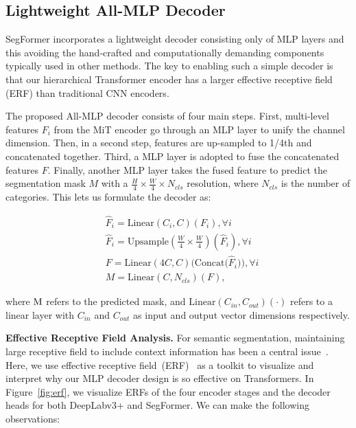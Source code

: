 \subsection{Lightweight All-MLP Decoder} \label{sec:MLP}

SegFormer incorporates a lightweight decoder consisting only of MLP layers and this avoiding the hand-crafted and computationally demanding components typically used in other methods. The key to enabling such a simple decoder is that our hierarchical Transformer encoder has a larger effective receptive field (ERF) than traditional CNN encoders. 

The proposed All-MLP decoder consists of four main steps. First, multi-level features ${F_i}$ from the MiT encoder go through an MLP layer to unify the channel dimension. Then, in a second step, features are up-sampled to 1/4th and concatenated together. Third, a MLP layer is adopted to fuse the concatenated features ${F}$. Finally, another MLP layer takes the fused feature to predict the segmentation mask $M$ with a $\frac{H}{4} \times \frac{W}{4} \times N_{cls}$ resolution, where $N_{cls}$ is the number of categories. This lets us formulate the decoder as:

\begin{equation}
    \begin{aligned}
    &{\hat{F}_i = \text{Linear}(C_i, C)(F_i)}, \forall i\\
    &{{\hat{F}}_i = \text{Upsample}(\frac{W}{4} \times \frac{W}{4})({\hat{F}}_i)}, \forall i\\
    &{{F} = \text{Linear}(4C, C)(\text{Concat}({\hat{F}}_i})), \forall i\\
    &{{M} = \text{Linear}(C, N_{cls})({F})},
    \end{aligned}
    \label{eqn:mlp}
\end{equation}

where ${\rm M}$ refers to the predicted mask, and $\text{Linear}(C_{in}, C_{out})(\cdot)$ refers to a linear layer with $C_{in}$ and $C_{out}$ as input and output vector dimensions respectively.

\textbf{Effective Receptive Field Analysis.} For semantic segmentation, maintaining large receptive field to include context information has been a central issue~\cite{dilate,largekernel,deeplabv3+}. Here, we use effective receptive field~(ERF)~\cite{erf} as a toolkit to visualize and interpret why our MLP decoder design is so effective on Transformers. In Figure~\ref{fig:erf}, we visualize ERFs of the four encoder stages and the decoder heads for both DeepLabv3+ and SegFormer. We can make the following observations:

